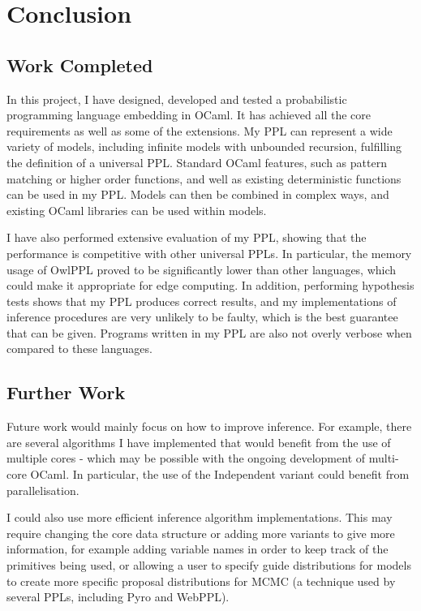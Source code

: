 \chapter{Conclusion}
\vspace{-5mm}
\section{Work Completed}
In this project, I have designed, developed and tested a probabilistic programming language embedding in OCaml. It has achieved all the core requirements as well as some of the extensions. My PPL can represent a wide variety of models, including infinite models with unbounded recursion, fulfilling the definition of a universal PPL. Standard OCaml features, such as pattern matching or higher order functions, and well as existing deterministic functions can be used in my PPL. Models can then be combined in complex ways, and existing OCaml libraries can be used within models.

I have also performed extensive evaluation of my PPL, showing that the performance is competitive with other universal PPLs. In particular, the memory usage of OwlPPL proved to be significantly lower than other languages, which could make it appropriate for edge computing. In addition, performing hypothesis tests shows that my PPL produces correct results, and my implementations of inference procedures are very unlikely to be faulty, which is the best guarantee that can be given. Programs written in my PPL are also not overly verbose when compared to these languages.

\section{Further Work}

Future work would mainly focus on how to improve inference. For example, there are several algorithms I have implemented that would benefit from the use of multiple cores - which may be possible with the ongoing development of multi-core OCaml. In particular, the use of the Independent variant could benefit from parallelisation. 

I could also use more efficient inference algorithm implementations. This may require changing the core data structure or adding more variants to give more information, for example adding variable names in order to keep track of the primitives being used, or allowing a user to specify guide distributions for models to create more specific proposal distributions for MCMC (a technique used by several PPLs, including Pyro and WebPPL).

